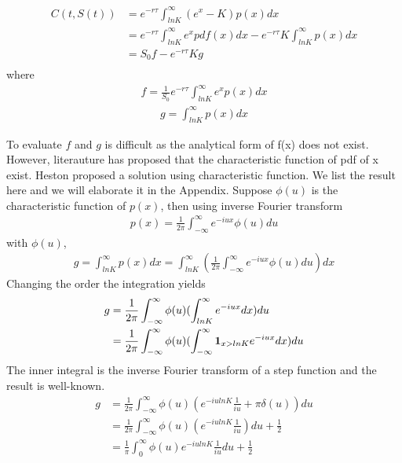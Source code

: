 \documentclass[a4paper]{article}
\begin{document}
\begin{align*}
	C(t, S(t)) & = e^{ -r \tau } \int_{lnK}^{\infty} (e^x - K) p(x) dx \\
	           & = e^{-r \tau}\int_{lnK}^{\infty} e^x pdf(x) dx - e^{-r\tau} K \int_{lnK}^{\infty}  p(x) dx \\
		   & = S_0 f -  e^{-r \tau} K g\\
\end{align*}
where 
\begin{align*}
	f = \frac{1}{S_0} e^{-r \tau}\int_{lnK}^{\infty} e^x p(x) dx
\end{align*}
\begin{align*}
	g = \int_{lnK}^{\infty}  p(x) dx
\end{align*}

To evaluate $f$ and $g$ is difficult as the analytical form of f(x) does not exist. However, literauture has proposed that the characteristic function of pdf of x exist. Heston \cite{heston} proposed a solution using characteristic function. We list the result here and we will elaborate it in the Appendix.
Suppose $\phi(u)$ is the characteristic function of $p(x)$, then using inverse Fourier transform
\begin{align*}
	p(x) = \frac{1}{2\pi} \int_{-\infty}^{\infty} e^{-iux}  \phi(u) du
\end{align*}
with $\phi(u)$, 
\begin{align*}
	g  = \int_{lnK}^{\infty}  p(x) dx
	   = \int_{lnK}^{\infty} ( \frac{1}{2\pi} \int_{-\infty}^{\infty} e^{-iux}  \phi(u) du) dx
\end{align*}
Changing the order the integration yields
\begin{align*}
	g & = \frac{1}{2\pi} \int_{-\infty}^{\infty}\phi(u) (\int_{lnK}^{\infty} e^{-iux}  dx) du \\
	  & = \frac{1}{2\pi} \int_{-\infty}^{\infty}\phi(u)(\int_{-\infty}^{\infty} {\bf 1}_{x > lnK}e^{-iux}dx) du\\
\end{align*}
The inner integral is the inverse Fourier transform of a step function and the result is well-known.
\begin{align*}
	g & = \frac{1}{2\pi} \int_{-\infty}^{\infty}\phi(u)( e^{-i u lnK}\frac{1}{iu } + \pi \delta(u)) du \\
	  & = \frac{1}{2\pi} \int_{-\infty}^{\infty}\phi(u)( e^{-i u lnK}\frac{1}{iu } ) du + \frac{1}{2} \\
	  & = \frac{1}{\pi} \int_{0}^{\infty}\phi(u) e^{-i u lnK}\frac{1}{iu }  du + \frac{1}{2}
\end{align*}
\end{document}
